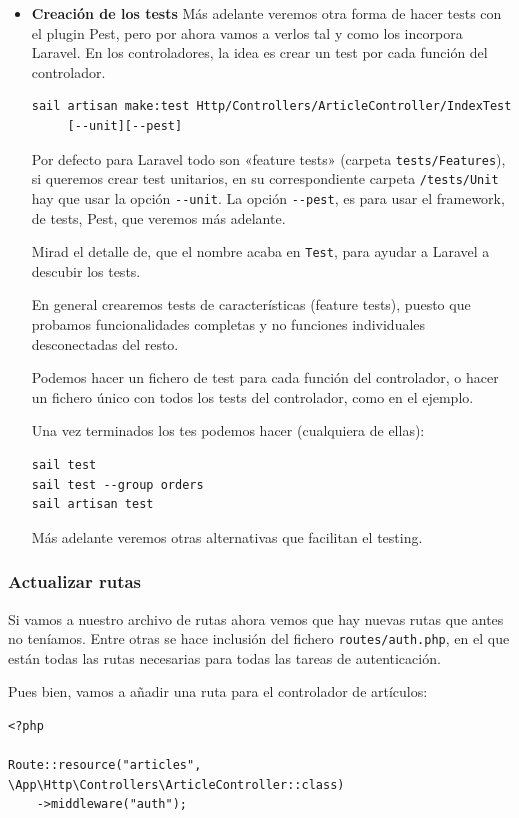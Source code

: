 \documentclass[11pt]{article}
\begin{document}
\begin{itemize}
\item \textbf{Creación de los tests}
\label{sec:orgc4c0b14}
Más adelante veremos otra forma de hacer tests con el plugin Pest,
pero por ahora vamos a verlos tal y como los incorpora Laravel.  En
los controladores, la idea es crear un test por cada función del
controlador.
\begin{verbatim}
sail artisan make:test Http/Controllers/ArticleController/IndexTest
     [--unit][--pest]
\end{verbatim}

Por defecto para Laravel todo son «feature tests» (carpeta
\texttt{tests/Features}), si queremos crear test unitarios, en su
correspondiente carpeta \texttt{/tests/Unit} hay que usar la opción
\texttt{-{}-{}unit}. La opción \texttt{-{}-{}pest}, es para usar el framework, de tests,
Pest, que veremos más adelante.

Mirad el detalle de, que el nombre acaba en \texttt{Test}, para ayudar a
Laravel a descubir los tests.

En general crearemos tests de características (feature tests), puesto
que probamos funcionalidades completas y no funciones individuales
desconectadas del resto.

Podemos hacer un fichero de test para cada función del controlador, o
hacer un fichero único con todos los tests del controlador, como en el
ejemplo.

Una vez terminados los tes podemos hacer (cualquiera de ellas):
\begin{verbatim}
sail test
sail test --group orders
sail artisan test
\end{verbatim}

Más adelante veremos otras alternativas que facilitan el testing.
\end{itemize}


\subsubsection{Actualizar rutas}
\label{sec:orgc859c2c}
Si vamos a nuestro archivo de rutas ahora vemos que hay nuevas rutas
que antes no teníamos. Entre otras se hace inclusión del fichero
\texttt{routes/auth.php}, en el que están todas las rutas necesarias para todas
las tareas de autenticación.

Pues bien, vamos a añadir una ruta para el controlador de artículos:
\begin{verbatim}
<?php

Route::resource("articles", \App\Http\Controllers\ArticleController::class)
    ->middleware("auth");
\end{verbatim}
\end{document}
